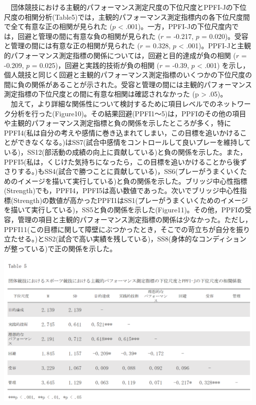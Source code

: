 \documentclass[12pt,a4paper,xelatex,ja=standard]{bxjsarticle}
\begin{document}
　団体競技における主観的パフォーマンス測定尺度の下位尺度とPPFI-Jの下位尺度の相関分析(Table5)では，主観的パフォーマンス測定指標内の各下位尺度間で全て有意な正の相関が見られた
(\(\mathit{p}\) \textless{}
.001)。一方，PPFI-Jの下位尺度内では，回避と管理の間に有意な負の相関が見られた
(\(\mathit{r}\) = -0.217, \(\mathit{p}\) =
0.020)。受容と管理の間には有意な正の相関が見られた (\(\mathit{r}\) =
0.328, \(\mathit{p}\) \textless{}
.001)。PPFI-Jと主観的パフォーマンス測定指標の関係については，回避と目的達成が負の相関
(\(\mathit{r}\) = -0.209, \(\mathit{p}\) =
0.025)，回避と実践的技術が負の相関 (\(\mathit{r}\) = -0.39,
\(\mathit{p}\) \textless{} .001)
を示し，個人競技と同じく回避と主観的パフォーマンス測定指標のいくつかの下位尺度の間に負の関係があることが示された。受容と管理の間には主観的パフォーマンス測定指標の下位尺度との間に有意な相関は確認されなかった
(p \textgreater{} .05)。\\
　加えて，より詳細な関係性について検討するために項目レベルでのネットワーク分析を行った(Figure10)。その結果回避(PPFI1～5)は，PPFIのその他の項目や主観的パフォーマンス測定指標と負の関係を示したところが多く，特にPPFI4(私は自分の考えや感情に巻き込まれてしまい，この目標を追いかけることができなくなる。)はSS7(試合中感情をコントロールして良いプレーを維持している)，SS12(部活動の成績の向上に貢献している)と負の関係を示した。また，PPFI5(私は，くじけた気持ちになったら，この目標を追いかけることから後ずさりする。)もSS4(試合で勝つことに貢献している)，SS6(プレーがうまくいくためのイメージを描いて実行している)と負の関係を示した。ブリッジ中心性指標(Strength)でも，PPFI4，PPFI5は高い数値であった。次いでブリッジ中心性指標(Strength)の数値が高かったPPFI1はSS1(プレーがうまくいくためのイメージを描いて実行している)，SS5と負の関係を示した(Figure11)。その他，PPFIの受容，管理の項目と主観的パフォーマンス測定指標の関係は少なかった。ただし，PPFI11(この目標に関して障壁にぶつかったとき，そこでの苛立ちが自分を振り立たせる。)とSS2(試合で高い実績を残している)，SS8(身体的なコンディションが整っている)で正の関係を示した。

\includegraphics{figure/table5.png}
\end{document}

